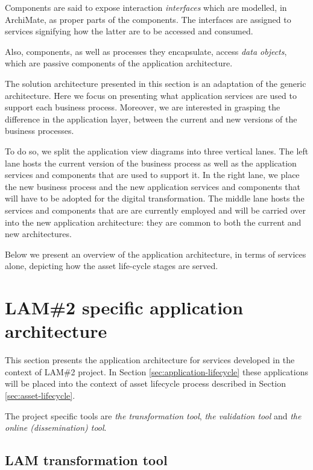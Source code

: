 	Components are said to expose interaction \textit{interfaces} which are modelled, in ArchiMate, as proper parts of the components. The interfaces are assigned to services signifying how the latter are to be accessed and consumed. 
	
	Also, components, as well as processes they encapsulate, access \textit{data objects}, which are passive components of the application architecture.

	The solution architecture presented in this section is an adaptation of the generic architecture. Here we focus on presenting what application services are used to support each business process. Moreover, we are interested in grasping the difference in the application layer, between the current and new versions of the business processes. 
	
	To do so, we split the application view diagrams into three vertical lanes. The left lane hosts the current version of the business process as well as the application services and components that are used to support it. In the right lane, we place the new business process and the new application services and components that will have to be adopted for the digital transformation. The middle lane hosts the services and components that are are currently employed and will be carried over into the new application architecture: they are common to both the current and new architectures.

	Below we present an overview of the application architecture, in terms of services alone, depicting how the asset life-cycle stages are served.	
	
	\section{LAM\#2 specific application architecture}

	This section presents the application architecture for services developed in the context of LAM\#2 project. In Section \ref{sec:application-lifecycle} these applications will be placed into the context of asset lifecycle process described in Section \ref{sec:asset-lifecycle}. 
	
	The project specific tools are \textit{the transformation tool}, \textit{the validation tool} and \textit{the online (dissemination) tool}.
	
	\subsection{LAM transformation tool}
	
